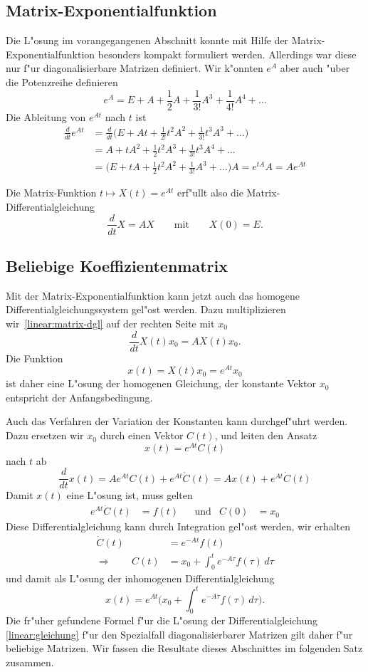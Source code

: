 \subsection{Matrix-Exponentialfunktion}
%
Die L"osung im vorangegangenen Abschnitt konnte mit Hilfe der
Matrix-Exponentialfunktion besonders kompakt formuliert werden.
Allerdings war diese nur f"ur diagonalisierbare Matrizen definiert.
Wir k"onnten $e^A$ aber auch "uber die Potenzreihe definieren
\[
e^A=E+A+\frac12A+\frac1{3!}A^3+\frac1{4!} A^4+\dots
\]
Die Ableitung von $e^{At}$ nach $t$ ist
\begin{align*}
\frac{d}{dt}e^{At}
&=
\frac{d}{dt}\biggl(E+At+\frac1{2!}t^2A^2+\frac1{3!}t^3A^3+\dots\Biggr)
\\
&=
A+tA^2+\frac12t^2A^3+\frac1{3!}t^3A^4+\dots
\\
&=
\biggl(E+tA+\frac12t^2A^2+\frac1{3!}A^3+\dots\biggr)A
=e^{tA}A=Ae^{At}
\end{align*}
\begin{satz}
\label{linear:matrix-exp}
Die Matrix-Funktion $t\mapsto X(t)=e^{At}$ erf"ullt also die
Matrix-Differentialgleichung
\begin{equation}
\frac{d}{dt} X = AX
\qquad\text{mit}\qquad
X(0)=E.
\label{linear:matrix-dgl}
\end{equation}
\end{satz}

\subsection{Beliebige Koeffizientenmatrix}
Mit der Matrix-Exponentialfunktion kann jetzt auch das homogene
Differentialgleichungssystem gel"ost werden.
Dazu multiplizieren wir~\eqref{linear:matrix-dgl} auf der rechten Seite
mit $x_0$ 
\[
\frac{d}{dt}X(t)x_0 = A X(t)x_0.
\]
Die Funktion
\[
x(t)=X(t)x_0 = e^{At}x_0
\]
ist daher eine L"osung der homogenen Gleichung, der konstante Vektor $x_0$ 
entspricht der Anfangsbedingung.

Auch das Verfahren der Variation der Konstanten kann durchgef"uhrt werden.
%
Dazu ersetzen wir $x_0$ durch einen Vektor $C(t)$, und leiten den Ansatz
\[
x(t)=e^{At}C(t)
\]
nach $t$ ab
\[
\frac{d}{dt}x(t)
=
Ae^{At}C(t) + e^{At}\dot{C}(t)
=
A x(t) + e^{At}\dot{C}(t)
\]
Damit $x(t)$ eine L"osung ist, muss gelten
\[
\begin{aligned}
e^{At}\dot{C}(t)
&=
f(t)
&&\text{und}
&
C(0)&=x_0
\end{aligned}
\]
Diese Differentialgleichung kann durch Integration gel"ost werden,
wir erhalten
\begin{align*}
\dot{C}(t)
&=
e^{-At}f(t)
\\
\Rightarrow\qquad
C(t)
&=
x_0+\int_0^t e^{-A\tau}f(\tau)\,d\tau
\end{align*}
und damit als L"osung der inhomogenen Differentialgleichung
\[
x(t)
=
e^{At}\biggl(
x_0+\int_0^t e^{-A\tau}f(\tau)\,d\tau
\biggr).
\]
Die fr"uher gefundene Formel f"ur die L"osung der Differentialgleichung
\eqref{linear:gleichung} f"ur den Spezialfall diagonalisierbarer 
Matrizen gilt daher f"ur beliebige Matrizen.
Wir fassen die Resultate dieses Abschnittes im folgenden Satz 
zusammen.


